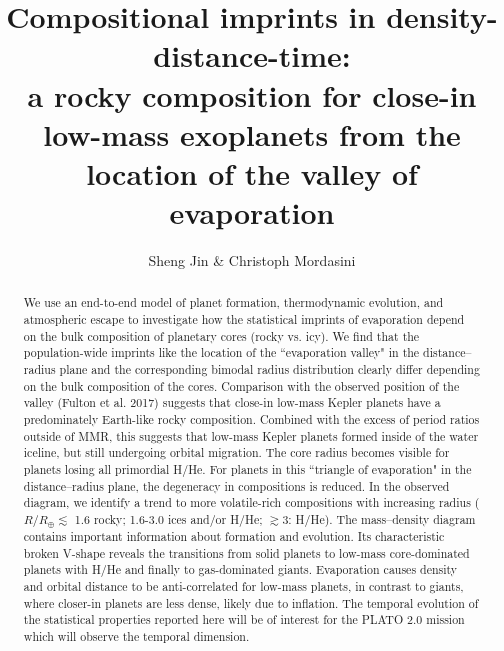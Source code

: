 \documentclass[]{emulateapj}
\def\rearth{R_{\oplus}}
\begin{document}
\title{Compositional imprints in density-distance-time:  \\ a rocky composition for close-in low-mass exoplanets from the location of the valley of evaporation}

\author{Sheng Jin \& Christoph Mordasini}




\begin{abstract}
We use an end-to-end model of planet formation, thermodynamic evolution, and atmospheric escape to investigate how the statistical imprints of evaporation depend on the bulk composition of planetary cores (rocky vs. icy). 
We find that the population-wide imprints like the location of the ``evaporation valley" in the distance--radius plane and the corresponding bimodal radius distribution clearly differ depending on the bulk composition of the cores. Comparison with the observed position of the valley (Fulton et al. 2017) suggests that close-in low-mass Kepler planets have a predominately Earth-like rocky composition. Combined with the excess of period ratios outside of MMR, this suggests that low-mass Kepler planets formed inside of the water iceline, but still undergoing orbital migration.
The core radius becomes visible for planets losing all primordial H/He. For planets in this ``triangle of evaporation" in the distance--radius plane, the degeneracy in compositions is reduced. In the observed diagram, we identify a trend to more volatile-rich compositions with increasing radius ($R/\rearth\lesssim$ 1.6 rocky; 1.6-3.0 ices and/or H/He; $\gtrsim 3$: H/He).   
The mass--density diagram contains important information about formation and evolution{. Its characteristic broken V-shape reveals} the transitions from solid planets {to} low-mass core-dominated planets with H/He {and finally} to  gas-dominated giants.
Evaporation causes density and orbital distance to be anti-correlated for low-mass planets, in contrast to giants, where closer-in planets are less dense, likely due to inflation. 
The temporal evolution of the statistical properties reported here will be of interest for the PLATO 2.0 mission which will observe the temporal dimension.
 
\end{abstract}
\end{document}
